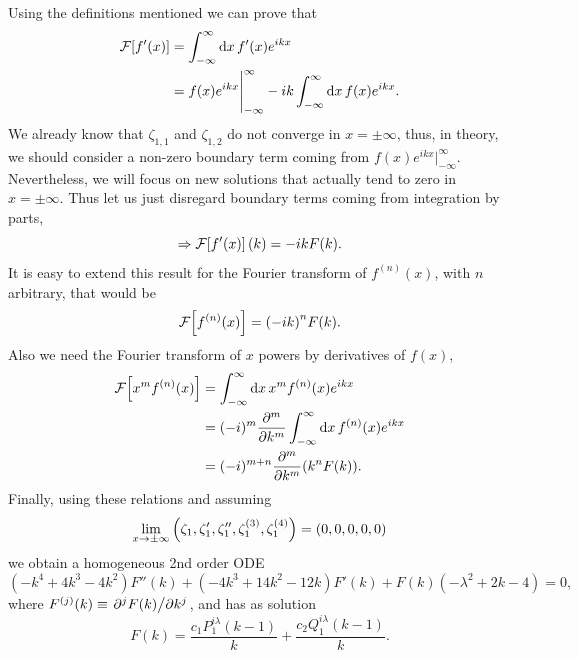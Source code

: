 \documentclass[%
 aip,
 jmp,%
 amsmath,amssymb,
 reprint,%
]{revtex4-2}
\begin{document}
Using the definitions mentioned we can prove that
\begin{equation*}
\begin{aligned}
   \mathcal{F}\qty[f'(x)] &= \int_{-\infty}^{\infty} \dd{x} f'(x)e^{ikx}\\
   &= f(x)e^{ikx}\Bigg|_{-\infty}^\infty - ik\int_{-\infty}^{\infty} \dd{x} f(x)e^{ikx}.
\end{aligned}
\end{equation*}
We already know that $\zeta_{1,1}$ and $\zeta_{1,2}$ do not converge in $x=\pm \infty$, thus, in theory, we should consider a non-zero boundary term coming from $f(x)e^{ikx}\Big|_{-\infty}^{\infty}$. Nevertheless, we will focus on new solutions that actually tend to zero in $x=\pm \infty$. Thus let us just disregard boundary terms coming from integration by parts,
\begin{equation*}
   \Rightarrow \mathcal{F}\qty[f'(x)](k) = -ikF(k).
\end{equation*}
It is easy to extend this result for the Fourier transform of $f^{(n)}(x)$, with $n$ arbitrary, that would be
\begin{equation}
   \mathcal{F}\qty[f^{(n)}(x)] = \qty(-ik)^nF(k).
\end{equation}
Also we need the Fourier transform of $x$ powers by derivatives of $f(x)$,
\begin{equation*}
\begin{aligned}
   \mathcal{F}\qty[x^mf^{(n)}(x)] &= \int_{-\infty}^\infty \dd{x} x^mf^{(n)}(x)e^{ikx}\\
   &= (-i)^m\pdv[m]{k}\int_{-\infty}^\infty \dd{x} f^{(n)}(x)e^{ikx}\\
   &= (-i)^{m+n}\pdv[m]{k} \qty(k^n F(k)).
\end{aligned}
\end{equation*}
Finally, using these relations and assuming
\begin{equation}
   \lim_{x\to\pm\infty}\qty(\zeta_1,\zeta_1',\zeta_1'',\zeta_1^{(3)},\zeta_1^{(4)}) = (0,0,0,0,0)
\end{equation}
we obtain a homogeneous 2nd order ODE
\begin{equation}
   \left(-k^4+4 k^3-4 k^2\right) F''(k)+\left(-4 k^3+14 k^2-12 k\right) F'(k)+F(k) \left(-\lambda ^2+2 k-4\right) = 0,
\end{equation}
where $F^{(j)}(k) \equiv \pdv*[j]{F(k)}{k}$, and has as solution
\begin{equation}
   F(k) = \frac{c_1 P_1^{i \lambda }(k-1)}{k}+\frac{c_2 Q_1^{i \lambda }(k-1)}{k}.
\end{equation}
\end{document}
